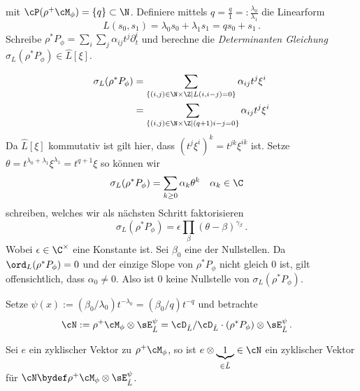 mit $\cP(\rho^+\cM_\phi)=\{q\}\subset\N$. Definiere mittels
$q=\frac{q}{1}=:\frac{\lambda_0}{\lambda_1}$ die  Linearform
\[
L(s_0,s_1)=\lambda_0s_0+\lambda_1s_1=qs_0+s_1 \,.
\]
Schreibe $\rho^*P_{\phi}=\sum_i\sum_j\alpha_{ij}t^j\partial_t^i$ und berechne
die \emph{Determinanten Gleichung} $\sigma_L(\rho^*P_{\phi})\in \hat L[\xi]$.
\begin{comment}
Schon gezeigt, das $ord_L = 0$?
\end{comment}
\begin{align*}
\sigma_L(\rho^*P_{\phi})
  &= \sum_{\{(i,j)\in\N\times\Z \mid L(i,i-j)=0\}}\alpha_{ij}t^j\xi^i\\
  &= \sum_{\{(i,j)\in\N\times\Z \mid (q+1)i-j=0\}}\alpha_{ij}t^j\xi^i
\end{align*}
Da $\hat L[\xi]$ kommutativ ist gilt hier, dass $(t^j\xi^i)^k=t^{jk}\xi^{ik}$ ist.
Setze $\theta=t^{\lambda_0+\lambda_1}\xi^{\lambda_1}=t^{q+1}\xi$ so können wir
\begin{align*}
\sigma_L(\rho^*P_{\phi}) &= \sum_{k\geq 0}\alpha_k\theta^k & & \alpha_k\in\C
\end{align*}
schreiben, welches wir als nächsten Schritt faktorisieren
\[
\sigma_L(\rho^*P_\phi)=\epsilon\prod_{\beta}(\theta-\beta)^{\gamma_\beta}\,.
\]
Wobei $\epsilon\in\C^\times$ eine Konstante ist.
Sei $\beta_0$  eine der Nullstellen.
Da $\ord_L(\rho^*P_\phi)=0$ und der einzige Slope von $\rho^*P_\phi$ nicht
gleich $0$ ist, gilt offensichtlich, dass $\alpha_0\neq0$. Also ist $0$ keine
Nullstelle von $\sigma_L(\rho^*P_\phi)$.
\begin{comment}
Setze $R(z):=(\beta_0/(\lambda_0+1))z^{\lambda_0+1}=(\beta_0/(q+1)z^{q+1}$ und
betrachte
\begin{align*}
\rho^+\cM_\phi\otimes\cF_{\hat L}^R
  &= \cD_{\hat L}/\cD_{\hat L}\cdot(\rho^*P_{\phi})\otimes\cF_{\hat L}^R \,.
\end{align*}
\end{comment}
Setze $\psi(x):=(\beta_0/\lambda_0)t^{-\lambda_0}=(\beta_0/q)t^{-q}$ und
betrachte
\begin{align*}
\cN:=\rho^+\cM_\phi\otimes\sE_{\hat L}^\psi
  &= \cD_{\hat L}/\cD_{\hat L}\cdot(\rho^*P_{\phi})\otimes\sE_{\hat L}^\psi \,.
\end{align*}
\begin{lem}
Sei $e$ ein zyklischer Vektor zu $\rho^+\cM_\phi$, so ist $e\otimes
\underset{\in\hat L}{\underbrace{1}}\in\cN$ ein zyklischer Vektor für
$\cN\bydef\rho^+\cM_\phi\otimes\sE_{\hat L}^\psi$.
\end{lem}
